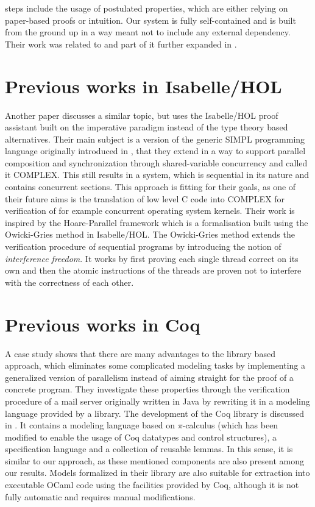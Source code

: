 steps include the usage of postulated properties, which are either relying on paper-based proofs or intuition. Our system is fully self-contained and is built from the ground up in a way meant not to include any external dependency. Their work was related to and part of it further expanded in \cite{Johan2018ProofCF}.

\section{Previous works in Isabelle/HOL}
Another paper\cite{Complx-Isabelle} discusses a similar topic, but uses the Isabelle/HOL proof assistant\cite{nipkow2002isabelle} built on the imperative paradigm instead of the type theory based alternatives. Their main subject is a version of the generic SIMPL programming language originally introduced in \cite{simpl-schirmer2006verification}, that they extend in a way to support parallel composition and synchronization through shared-variable concurrency and called it COMPLEX. This still results in a system, which is sequential in its nature and contains concurrent sections. This approach is fitting for their goals, as one of their future aims is the translation of low level C code into COMPLEX for verification of for example concurrent operating system kernels. Their work is inspired by the Hoare-Parallel framework\cite{hoare-parallel-nieto2002verification} which is a formalisation built using the Owicki-Gries method\cite{owicki1976axiomatic} in Isabelle/HOL. The Owicki-Gries method extends the verification procedure of sequential programs by introducing the notion of \textit{interference freedom}. It works by first proving each single thread correct on its own and then the atomic instructions of the threads are proven not to interfere with the correctness of each other.

\section{Previous works in Coq}
A case study\cite{coq-concurrent-verification-case-study} shows that there are many advantages to the library based approach, which eliminates some complicated modeling tasks by implementing a generalized version of parallelism instead of aiming straight for the proof of a concrete program. They investigate these properties through the verification procedure of a mail server originally written in Java by rewriting it in a modeling language provided by a library. \cite{coq-mail-server} The development of the Coq library is discussed in \cite{AFFELDT200817}. It contains a modeling language based on $\pi$-calculus
\cite{MILNER19921}
\cite{MILNER199241}
\cite{sangiorgi2003pi}
(which has been modified to enable the usage of Coq datatypes and control structures), a specification language and a collection of reusable lemmas. In this sense, it is similar to our approach, as these mentioned components are also present among our results. Models formalized in their library are also suitable for extraction into executable OCaml code using the facilities provided by Coq, although it is not fully automatic and requires manual modifications.


